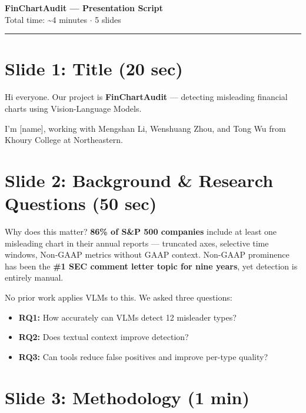 \documentclass[11pt]{article}
\begin{document}
{\LARGE\bfseries\color{dblue} FinChartAudit --- Presentation Script}\\[4pt]
{\large Total time: \textasciitilde4 minutes $\cdot$ 5 slides}

\vspace{12pt}
\hrule
\vspace{12pt}

\section{Slide 1: Title \textnormal{\small(20 sec)}}

Hi everyone. Our project is \textbf{FinChartAudit} --- detecting misleading financial charts using Vision-Language Models.

I'm [name], working with Mengshan Li, Wenshuang Zhou, and Tong Wu from Khoury College at Northeastern.

\section{Slide 2: Background \& Research Questions \textnormal{\small(50 sec)}}

Why does this matter? \textbf{86\% of S\&P 500 companies} include at least one misleading chart in their annual reports --- truncated axes, selective time windows, Non-GAAP metrics without GAAP context. Non-GAAP prominence has been the \textbf{\#1 SEC comment letter topic for nine years}, yet detection is entirely manual.

No prior work applies VLMs to this. We asked three questions:

\begin{itemize}[nosep,leftmargin=1.5em]
\item \textbf{RQ1:} How accurately can VLMs detect 12 misleader types?
\item \textbf{RQ2:} Does textual context improve detection?
\item \textbf{RQ3:} Can tools reduce false positives and improve per-type quality?
\end{itemize}

\section{Slide 3: Methodology \textnormal{\small(1 min)}}
\end{document}
